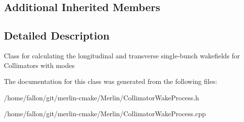 \subsection*{Additional Inherited Members}


\subsection{Detailed Description}
Class for calculating the longitudinal and transverse single-\/bunch wakefields for Collimators with modes 

The documentation for this class was generated from the following files\+:\begin{DoxyCompactItemize}
\item 
/home/fallon/git/merlin-\/cmake/\+Merlin/Collimator\+Wake\+Process.\+h\item 
/home/fallon/git/merlin-\/cmake/\+Merlin/Collimator\+Wake\+Process.\+cpp\end{DoxyCompactItemize}
